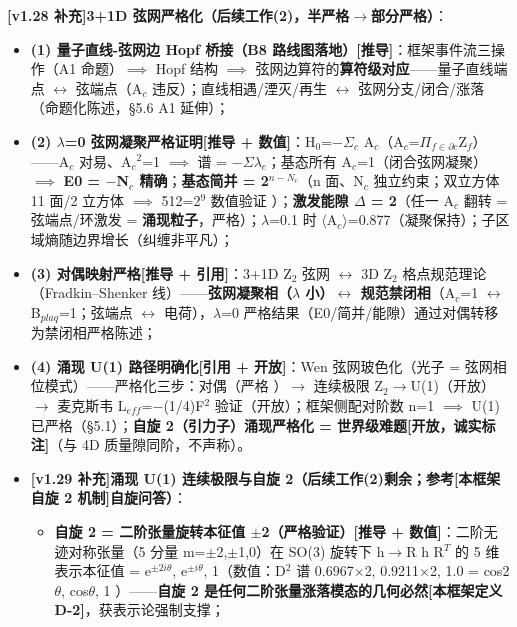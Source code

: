 \documentclass[12pt]{article}
\newcommand{\mtag}[1]{\textbf{[#1]}}
\newcommand{\up}[1]{\ensuremath{^{#1}}}
\newcommand{\down}[1]{\ensuremath{_{#1}}}
\begin{document}
\textbf{\mtag{v1.28 补充}3+1D 弦网严格化（后续工作(2)，半严格\ensuremath{\to}部分严格）}：
\begin{itemize}
\item \textbf{(1) 量子直线-弦网边 Hopf 桥接（B8 路线图落地）}\mtag{推导}：框架事件流三操作（A1 命题）\ensuremath{\implies} Hopf 结构 \ensuremath{\implies} 弦网边算符的\textbf{算符级对应}------量子直线端点 \ensuremath{\leftrightarrow} 弦端点（A\down{c} 违反）；直线相遇/湮灭/再生 \ensuremath{\leftrightarrow} 弦网分支/闭合/涨落（命题化陈述，\S{}5.6 A1 延伸）；
\item \textbf{(2) \ensuremath{\lambda}=0 弦网凝聚严格证明}\mtag{推导 + 数值}：H\down{0}=\ensuremath{-}\ensuremath{\Sigma}\down{c} A\down{c}（A\down{c}=\ensuremath{\Pi}\down{f\in{}\partial{}c}Z\down{f}）------A\down{c} 对易、A\down{c}\up{2}=1 \ensuremath{\implies} 谱 = \ensuremath{-}\ensuremath{\Sigma}\ensuremath{\lambda}\down{c}；基态所有 A\down{c}=1（闭合弦网凝聚）\ensuremath{\implies} \textbf{E0 = \ensuremath{-}N\down{c} 精确}；\textbf{基态简并 = 2\up{n-N\down{c}}}（n 面、N\down{c} 独立约束；双立方体 11 面/2 立方体 \ensuremath{\implies} 512=2\up{9} 数值验证 \checkmark）；\textbf{激发能隙 \ensuremath{\Delta} = 2}（任一 A\down{c} 翻转 = 弦端点/环激发 = \textbf{涌现粒子}，严格）；\ensuremath{\lambda}=0.1 时 \ensuremath{\langle}A\down{c}\ensuremath{\rangle}=0.877（凝聚保持）；子区域熵随边界增长（纠缠非平凡）；
\item \textbf{(3) 对偶映射严格}\mtag{推导 + 引用}：3+1D Z\down{2} 弦网 \ensuremath{\leftrightarrow} 3D Z\down{2} 格点规范理论（Fradkin--Shenker 线）------\textbf{弦网凝聚相（\ensuremath{\lambda} 小）\ensuremath{\leftrightarrow} 规范禁闭相}（A\down{c}=1 \ensuremath{\leftrightarrow} B\down{plaq}=1；弦端点 \ensuremath{\leftrightarrow} 电荷），\ensuremath{\lambda}=0 严格结果（E0/简并/能隙）通过对偶转移为禁闭相严格陈述；
\item \textbf{(4) 涌现 U(1) 路径明确化}\mtag{引用 + 开放}：Wen 弦网玻色化（光子 = 弦网相位模式）------严格化三步：对偶（严格 \checkmark）\ensuremath{\to} 连续极限 Z\down{2}\ensuremath{\to}U(1)（开放）\ensuremath{\to} 麦克斯韦 L\down{eff}=\ensuremath{-}(1/4)F\up{2} 验证（开放）；框架侧配对阶数 n=1 \ensuremath{\implies} U(1) 已严格（\S{}5.1）；\textbf{自旋 2（引力子）涌现严格化 = 世界级难题}\mtag{开放，诚实标注}（与 4D 质量隙同阶，不声称）。
\item \textbf{\mtag{v1.29 补充}涌现 U(1) 连续极限与自旋 2（后续工作(2)剩余；参考\mtag{本框架自旋 2 机制}自旋问答）}：
\begin{itemize}
\item \textbf{自旋 2 = 二阶张量旋转本征值 \ensuremath{\pm}2（严格验证）}\mtag{推导 + 数值}：二阶无迹对称张量（5 分量 m=\ensuremath{\pm}2,\ensuremath{\pm}1,0）在 SO(3) 旋转下 h\ensuremath{\to}R h R\up{T} 的 5 维表示本征值 = {e\up{\pm{}2i\theta{}}, e\up{\pm{}i\theta{}}, 1}（数值：D\up{2} 谱 {0.6967\ensuremath{\times}2, 0.9211\ensuremath{\times}2, 1.0} = {cos2\ensuremath{\theta}, cos\ensuremath{\theta}, 1} \checkmark）------\textbf{自旋 2 是任何二阶张量涨落模态的几何必然}\mtag{本框架定义 D-2}，获表示论强制支撑；

\end{itemize}
\end{itemize}
\end{document}
